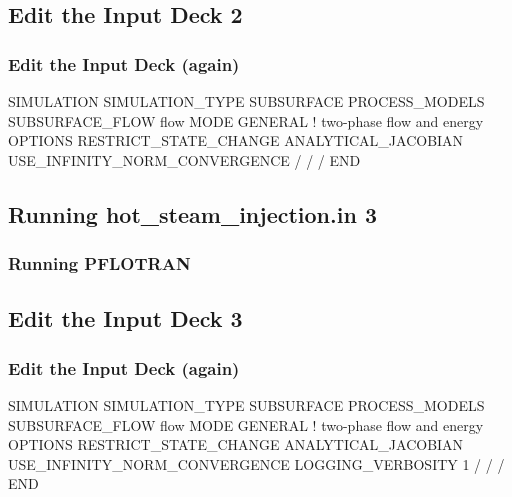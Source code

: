 \documentclass{beamer}
\begin{document}
\subsection{Edit the Input Deck 2}

\begin{frame}[fragile]\frametitle{Edit the Input Deck (again)}

\begin{semiverbatim}

SIMULATION
  SIMULATION_TYPE SUBSURFACE
  PROCESS_MODELS
    SUBSURFACE_FLOW flow
      MODE GENERAL ! two-phase flow and energy
      OPTIONS
        RESTRICT_STATE_CHANGE
        ANALYTICAL_JACOBIAN
        USE_INFINITY_NORM_CONVERGENCE
      /
    /
  /
END

\end{semiverbatim}

\end{frame}

\subsection{Running hot_steam_injection.in 3}

\begin{frame}[fragile]\frametitle{Running PFLOTRAN}


\end{frame}

\subsection{Edit the Input Deck 3}

\begin{frame}[fragile]\frametitle{Edit the Input Deck (again)}

\begin{semiverbatim}

SIMULATION
  SIMULATION_TYPE SUBSURFACE
  PROCESS_MODELS
    SUBSURFACE_FLOW flow
      MODE GENERAL ! two-phase flow and energy
      OPTIONS
        RESTRICT_STATE_CHANGE
        ANALYTICAL_JACOBIAN
        USE_INFINITY_NORM_CONVERGENCE
        LOGGING_VERBOSITY 1
      / 
    / 
  / 
END 

\end{semiverbatim}

\end{frame}
\end{document}
